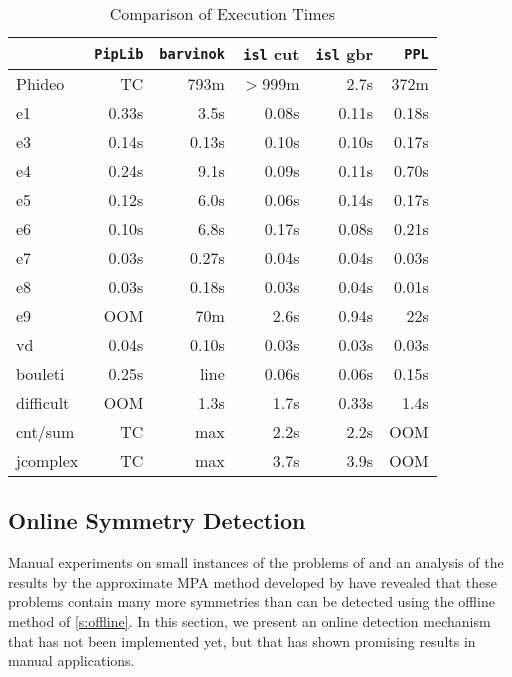 \begin{table}
\begin{center}
\begin{tabular}{lrrrrr}
    & {\tt PipLib} & {\tt barvinok} & {\tt isl} cut & {\tt isl} gbr & {\tt PPL} \\
\hline
\hline
Phideo & TC    & 793m   & $>$999m &   2.7s  & 372m \\
\hline
e1 & 0.33s & 3.5s & 0.08s & 0.11s & 0.18s \\
e3 & 0.14s & 0.13s & 0.10s & 0.10s & 0.17s \\
e4 & 0.24s & 9.1s & 0.09s & 0.11s & 0.70s \\
e5 & 0.12s & 6.0s & 0.06s & 0.14s & 0.17s \\
e6 & 0.10s & 6.8s & 0.17s & 0.08s & 0.21s \\
e7 & 0.03s & 0.27s & 0.04s & 0.04s & 0.03s \\
e8 & 0.03s & 0.18s & 0.03s & 0.04s & 0.01s \\
e9 & OOM & 70m & 2.6s & 0.94s & 22s \\
vd & 0.04s & 0.10s & 0.03s & 0.03s & 0.03s \\
bouleti & 0.25s & line & 0.06s & 0.06s & 0.15s \\
difficult & OOM & 1.3s & 1.7s & 0.33s & 1.4s \\
\hline
cnt/sum & TC & max & 2.2s & 2.2s & OOM \\
jcomplex & TC & max & 3.7s & 3.9s & OOM \\
\end{tabular}
\caption{Comparison of Execution Times}
\label{t:comparison}
\end{center}
\end{table}

\subsection{Online Symmetry Detection}\label{s:online}

Manual experiments on small instances of the problems of
 and an analysis of the results
by the approximate MPA method developed by 
have revealed that these problems contain many more symmetries
than can be detected using the offline method of \autoref{s:offline}.
In this section, we present an online detection mechanism that has
not been implemented yet, but that has shown promising results
in manual applications.

